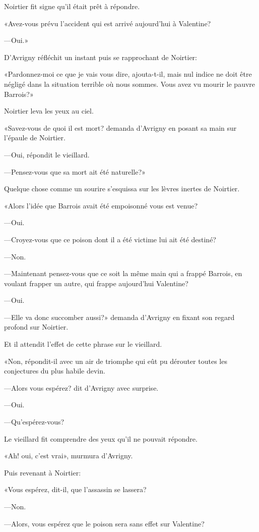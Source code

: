 Noirtier fit signe qu'il était prêt à répondre. 

«Avez-vous prévu l'accident qui est arrivé aujourd'hui à Valentine? 

—Oui.» 

D'Avrigny réfléchit un instant puis se rapprochant de Noirtier: 

«Pardonnez-moi ce que je vais vous dire, ajouta-t-il, mais nul indice ne doit être négligé dans la situation terrible où nous sommes. Vous avez vu mourir le pauvre Barrois?» 

Noirtier leva les yeux au ciel. 

«Savez-vous de quoi il est mort? demanda d'Avrigny en posant sa main sur l'épaule de Noirtier. 

—Oui, répondit le vieillard. 

—Pensez-vous que sa mort ait été naturelle?» 

Quelque chose comme un sourire s'esquissa sur les lèvres inertes de Noirtier. 

«Alors l'idée que Barrois avait été empoisonné vous est venue? 

—Oui. 

—Croyez-vous que ce poison dont il a été victime lui ait été destiné? 

—Non. 

—Maintenant pensez-vous que ce soit la même main qui a frappé Barrois, en voulant frapper un autre, qui frappe aujourd'hui Valentine? 

—Oui. 

—Elle va donc succomber aussi?» demanda d'Avrigny en fixant son regard profond sur Noirtier. 

Et il attendit l'effet de cette phrase sur le vieillard. 

«Non, répondit-il avec un air de triomphe qui eût pu dérouter toutes les conjectures du plus habile devin. 

—Alors vous espérez? dit d'Avrigny avec surprise. 

—Oui. 

—Qu'espérez-vous? 

Le vieillard fit comprendre des yeux qu'il ne pouvait répondre. 

«Ah! oui, c'est vrai», murmura d'Avrigny. 

Puis revenant à Noirtier: 

«Vous espérez, dit-il, que l'assassin se lassera? 

—Non. 

—Alors, vous espérez que le poison sera sans effet sur Valentine? 

